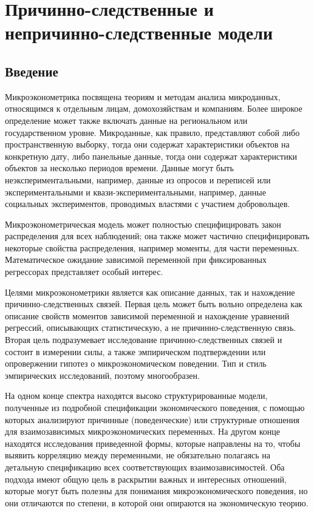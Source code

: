 
\chapter{Причинно-следственные и непричинно-следственные модели}

\section{Введение}

	Микроэконометрика посвящена теориям и методам анализа микроданных, относящимся к отдельным лицам, домохозяйствам и компаниям. Более широкое определение может также включать данные на региональном или государственном уровне. Микроданные, как правило, представляют собой либо пространственную выборку, тогда они содержат характеристики объектов на  конкретную дату, либо панельные данные, тогда они содержат характеристики объектов за несколько периодов времени. Данные могут быть неэкспериментальными, например, данные из опросов и переписей или экспериментальными и квази-экспериментальными, например, данные социальных  экспериментов, проводимых властями с участием добровольцев. 
	
	
	Микроэконометрическая модель может полностью  специфицировать закон распределения для всех наблюдений; она также может частично специфицировать некоторые свойства распределения, например моменты, для части переменных. Математическое ожидание зависимой переменной при фиксированных регрессорах представляет особый интерес. 
	
	
	Целями микроэконометрики является как описание данных, так и нахождение причинно-следственных связей. 
	Первая цель может быть вольно определена как описание свойств моментов зависимой переменной и нахождение уравнений регрессий, описывающих статистическую, а не причинно-следственную связь. Вторая цель подразумевает исследование причинно-следственных связей и состоит в измерении силы, а также эмпирическом подтверждении или опровержении гипотез о микроэкономическом поведении. Тип и стиль эмпирических исследований, поэтому многообразен. 
	
	На одном конце спектра находятся высоко структурированные модели, полученные из подробной спецификации экономического поведения, с помощью которых анализируют причинные (поведенческие) или структурные отношения для взаимозависимых микроэкономических переменных. На другом конце находятся исследования приведенной формы, которые направлены на то, чтобы выявить корреляцию между переменными, не обязательно полагаясь на детальную спецификацию всех соответствующих взаимозависимостей. Оба подхода имеют общую цель в раскрытии важных и интересных отношений, которые могут быть полезны для понимания микроэкономического поведения, но они отличаются по степени, в которой они опираются на экономическую теорию. 
	

